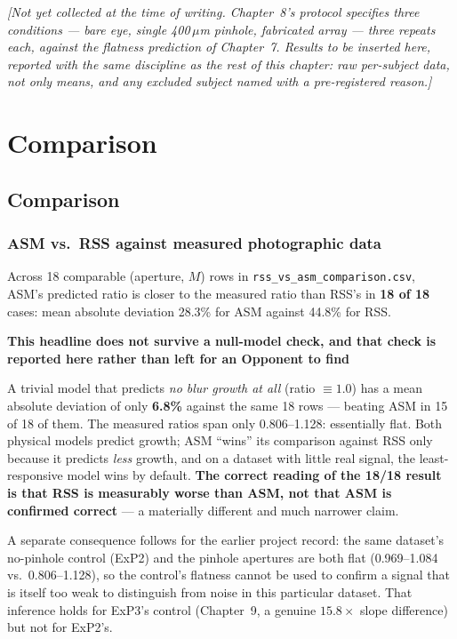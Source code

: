 \documentclass[11pt]{report}
\newenvironment{warnbox}[1]%
{\par\vspace{6pt}\begin{lrbox}{\wbsave}\begin{minipage}{0.88\textwidth}%
{\bfseries\color{warnred}#1}\par\vspace{4pt}\ignorespaces}%
{\end{minipage}\end{lrbox}%
\begin{center}\setlength{\fboxrule}{1.2pt}\setlength{\fboxsep}{7pt}%
\fcolorbox{warnred}{white}{\usebox{\wbsave}}\end{center}\vspace{6pt}\par}
\begin{document}
\emph{[Not yet collected at the time of writing. Chapter~8's protocol specifies three
conditions --- bare eye, single 400\,$\mu$m pinhole, fabricated array --- three repeats
each, against the flatness prediction of Chapter~7. Results to be inserted here, reported
with the same discipline as the rest of this chapter: raw per-subject data, not only means,
and any excluded subject named with a pre-registered reason.]}

\part{Comparison}

\chapter{Comparison}

\section{ASM vs.\ RSS against measured photographic data}

Across 18 comparable (aperture, $M$) rows in \texttt{rss\_vs\_asm\_comparison.csv}, ASM's
predicted ratio is closer to the measured ratio than RSS's in \textbf{18 of 18} cases: mean
absolute deviation 28.3\% for ASM against 44.8\% for RSS.

\begin{warnbox}{This headline does not survive a null-model check, and that check is
reported here rather than left for an Opponent to find}
A trivial model that predicts \emph{no blur growth at all} (ratio $\equiv 1.0$) has a mean
absolute deviation of only \textbf{6.8\%} against the same 18 rows --- beating ASM in 15 of
18 of them. The measured ratios span only 0.806--1.128: essentially flat. Both physical
models predict growth; ASM ``wins'' its comparison against RSS only because it predicts
\emph{less} growth, and on a dataset with little real signal, the least-responsive model
wins by default. \textbf{The correct reading of the 18/18 result is that RSS is
measurably worse than ASM, not that ASM is confirmed correct} --- a materially different
and much narrower claim.
\end{warnbox}

A separate consequence follows for the earlier project record: the same dataset's
no-pinhole control (ExP2) and the pinhole apertures are both flat (0.969--1.084 vs.\
0.806--1.128), so the control's flatness cannot be used to confirm a signal that is itself
too weak to distinguish from noise in this particular dataset. That inference holds for
ExP3's control (Chapter~9, a genuine $15.8\times$ slope difference) but not for ExP2's.
\end{document}
